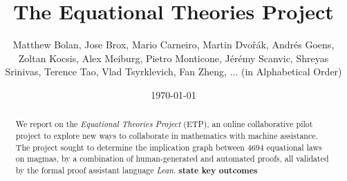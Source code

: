 \documentclass[12pt]{amsart}
\title{The Equational Theories Project}
\author[Equational Theories Project]{Matthew Bolan, Jose Brox, Mario Carneiro, Martin Dvo\v{r}\'ak, Andr\'es Goens, Zoltan Kocsis, Alex Meiburg, Pietro Monticone, J\'er\'emy Scanvic, Shreyas Srinivas, Terence Tao, Vlad Tsyrklevich, Fan Zheng, ... (in Alphabetical Order)}
\date{\today}
\theoremstyle{definition}
\newcommand{\note}[1]{{\bf #1}}
\begin{document}
\begin{abstract}
  We report on the \emph{Equational Theories Project} (ETP), an online collaborative pilot project
  to explore new ways to collaborate in mathematics with machine assistance. The project sought to
  determine the implication graph between $4694$ equational laws on magmas, by a combination of
  human-generated and automated proofs, all validated by the formal proof assistant language
  \emph{Lean}. \note{state key outcomes}
\end{abstract}

\maketitle

\tableofcontents

















\appendix


% 




\end{document}
